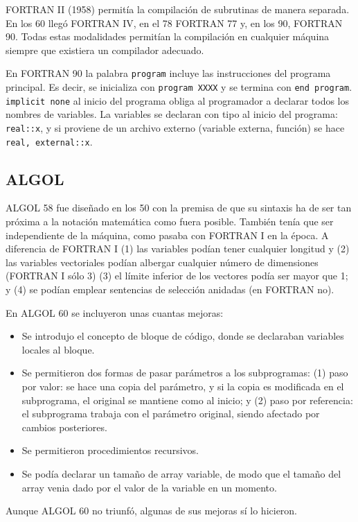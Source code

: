 \documentclass[a4paper]{article}
\begin{document}
	FORTRAN II (1958) permitía la compilación de subrutinas de manera separada. En los 60 llegó FORTRAN IV, en el 78 FORTRAN 77 y, en los 90, FORTRAN 90. Todas estas modalidades permitían la compilación en cualquier máquina siempre que existiera un compilador adecuado. 
	
	En FORTRAN 90 la palabra \verb|program| incluye las instrucciones del programa principal. Es decir, se inicializa con \verb|program XXXX| y se termina con \verb|end program|. \verb|implicit none| al inicio del programa obliga al programador a declarar todos los nombres de variables. La variables se declaran con tipo al inicio del programa: \verb|real::x|, y si proviene de un archivo externo (variable externa, función) se hace \verb|real, external::x|.
 	
 	\subsection{ALGOL}
 	ALGOL 58 fue diseñado en los 50 con la premisa de que su sintaxis ha de ser tan próxima a la notación matemática como fuera posible. También tenía que ser independiente de la máquina, como pasaba con FORTRAN I en la época. A diferencia de FORTRAN I (1) las variables podían tener cualquier longitud y (2) las variables vectoriales podían albergar cualquier número de dimensiones (FORTRAN I sólo 3) (3) el límite inferior de los vectores podía ser mayor que 1; y (4) se podían emplear sentencias de selección anidadas (en FORTRAN no).
 	
 	En ALGOL 60 se incluyeron unas cuantas mejoras:
 	\begin{itemize}
 		\item Se introdujo el concepto de bloque de código, donde se declaraban variables locales al bloque.
 		\item Se permitieron dos formas de pasar parámetros a los subprogramas: (1) paso por valor: se hace una copia del parámetro, y si la copia es modificada en el subprograma, el original se mantiene como al inicio; y (2) paso por referencia: el subprograma trabaja con el parámetro original, siendo afectado por cambios posteriores.
 		\item Se permitieron procedimientos recursivos.
 		\item Se podía declarar un tamaño de array variable, de modo que el tamaño del array venia dado por el valor de la variable en un momento.
 	\end{itemize}
	
	Aunque ALGOL 60 no triunfó, algunas de sus mejoras sí lo hicieron.
	
\end{document}
